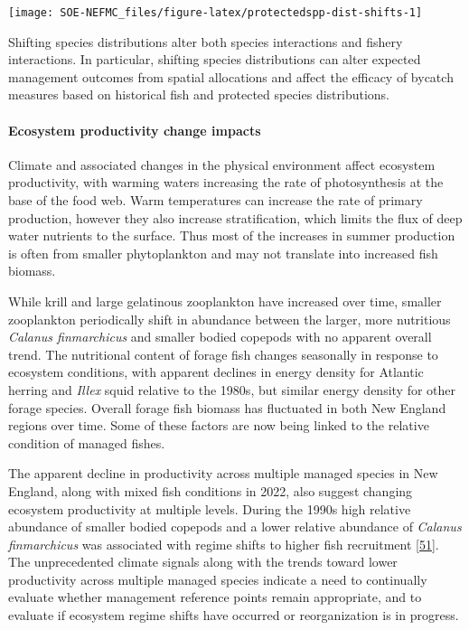 \documentclass[
  10pt,
]{article}
\let\origfigure\figure
\let\endorigfigure\endfigure
\renewenvironment{figure}[1][2] {
    \expandafter\origfigure\expandafter[H]
} {
    \endorigfigure
}
\begin{document}
\begin{figure}

{\centering \texttt{[image: SOE-NEFMC\_files/figure-latex/protectedspp-dist-shifts-1]} 

}

\caption{Direction and magnitude of core habitat shifts, represented by the length of the line of the seasonal weighted centroid for species with more than 70 km difference between 2010 and 2017 (tip of arrow).}\label{fig:protectedspp-dist-shifts}
\end{figure}

Shifting species distributions alter both species interactions and fishery interactions. In particular, shifting species distributions can alter expected management outcomes from spatial allocations and affect the efficacy of bycatch measures based on historical fish and protected species distributions.

\hypertarget{ecosystem-productivity-change-impacts}{%
\paragraph{Ecosystem productivity change impacts}\label{ecosystem-productivity-change-impacts}}

Climate and associated changes in the physical environment affect ecosystem productivity, with warming waters increasing the rate of photosynthesis at the base of the food web. Warm temperatures can increase the rate of primary production, however they also increase stratification, which limits the flux of deep water nutrients to the surface. Thus most of the increases in summer production is often from smaller phytoplankton and may not translate into increased fish biomass.

While krill and large gelatinous zooplankton have increased over time, smaller zooplankton periodically shift in abundance between the larger, more nutritious \emph{Calanus finmarchicus} and smaller bodied copepods with no apparent overall trend. The nutritional content of forage fish changes seasonally in response to ecosystem conditions, with apparent declines in energy density for Atlantic herring and \emph{Illex} squid relative to the 1980s, but similar energy density for other forage species. Overall forage fish biomass has fluctuated in both New England regions over time. Some of these factors are now being linked to the relative condition of managed fishes.

The apparent decline in productivity across multiple managed species in New England, along with mixed fish conditions in 2022, also suggest changing ecosystem productivity at multiple levels. During the 1990s high relative abundance of smaller bodied copepods and a lower relative abundance of \emph{Calanus finmarchicus} was associated with regime shifts to higher fish recruitment {[}\protect\hyperlink{ref-perretti_regime_2017}{51}{]}. The unprecedented climate signals along with the trends toward lower productivity across multiple managed species indicate a need to continually evaluate whether management reference points remain appropriate, and to evaluate if ecosystem regime shifts have occurred or reorganization is in progress.
\end{document}
